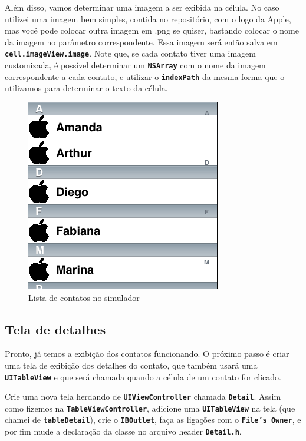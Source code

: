 \documentclass[a4paper,12pt,brazil,doubleside]{book}
\begin{document}
\begin{singlespace}
Além disso, vamos determinar uma imagem a ser exibida na célula. No caso utilizei uma imagem bem simples, contida no repositório, com o logo da Apple, mas você pode colocar outra imagem em .png se quiser, bastando colocar o nome da imagem no parâmetro correspondente. Essa imagem será então salva em \texttt{\textbf{cell.imageView.image}}. Note que, se cada contato tiver uma imagem customizada, é possível determinar um \texttt{\textbf{NSArray}} com o nome da imagem correspondente a cada contato, e utilizar o \texttt{\textbf{indexPath}} da mesma forma que o utilizamos para determinar o texto da célula.

\bigskip
\bigskip

\begin{figure}[H]
  \centering
  \includegraphics[width=.75\textwidth]{figuras/table/table3.png}
  \caption{Lista de contatos no simulador}
  \label{fig:a}
\end{figure}

\subsection{Tela de detalhes}


Pronto, já temos a exibição dos contatos funcionando. O próximo passo é criar uma tela de exibição dos detalhes do contato, que também usará uma \texttt{\textbf{UITableView}} e que será chamada quando a célula de um contato for clicado.

Crie uma nova tela herdando de \texttt{\textbf{UIViewController}} chamada \texttt{\textbf{Detail}}. Assim como fizemos na \texttt{\textbf{TableViewController}}, adicione uma \texttt{\textbf{UITableView}} na tela (que chamei de \texttt{\textbf{tableDetail}}), crie o \texttt{\textbf{IBOutlet}}, faça as ligações com o \texttt{\textbf{File's Owner}}, e por fim mude a declaração da classe no arquivo header \texttt{\textbf{Detail.h}}.


\end{singlespace}
\end{document}
